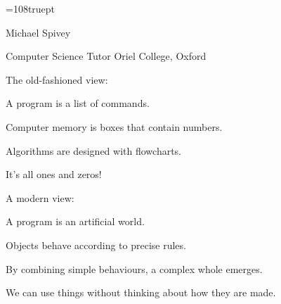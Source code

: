 

\newdimen\picwidth \picwidth=108truept

\def\picture#1{\hbox{\epsfbox{pics/oview-#1.eps}}}

\def\demo{\vskip\parskip
  \begingroup
    \afterassignment\demoi\count255=}
\def\demoi{\catcode`\$=12 \catcode`\&=12 \demoii}
\def\demoii#1{\line{\setbox0=\picture{\the\count255}%
   \vbox to\ht0{\vss \halign{\strut\vsf ##\cr#1\crcr} \vss}%
    \hfil
    \hbox to\picwidth{%
      \hskip 0pt plus 1fil minus 1fil
      \box0
      \hskip 0pt plus 1fil}}
  \endgroup}




\blankslide

{\grid\twentysfb
\incolour{}\par}
\vfill
{\twelvepoint\sf\noindent
Michael Spivey\par
\noindent
\sfi Computer Science Tutor\hfil\break
Oriel College, Oxford}


The old-fashioned view:

\item A program is a list of commands.
\item Computer memory is boxes that contain numbers.
\item Algorithms are designed with flowcharts.
\item It's all ones and zeros!


A modern view:

\item A program is an artificial world.
\item Objects behave according to precise rules.
\item By combining simple behaviours, a complex whole emerges.
\item We can use things without thinking about how they are made.

